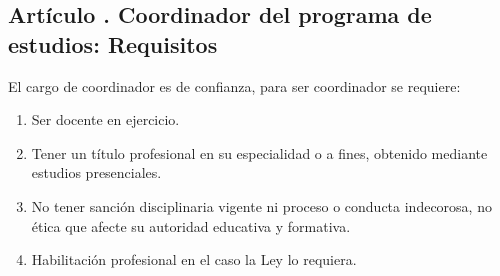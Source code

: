 \subsection{Artículo . Coordinador del programa de estudios: Requisitos}
\addtocounter{ns}{1}
El cargo de coordinador es de confianza, para ser coordinador se requiere: 
\begin{enumerate}
\item Ser docente en ejercicio.  
\item Tener un título profesional en su especialidad o a fines, obtenido mediante estudios presenciales.  
\item No tener sanción disciplinaria vigente ni proceso o conducta indecorosa, no ética que afecte su autoridad educativa y formativa. 
\item Habilitación profesional en el caso la Ley lo requiera. 
\end{enumerate}
